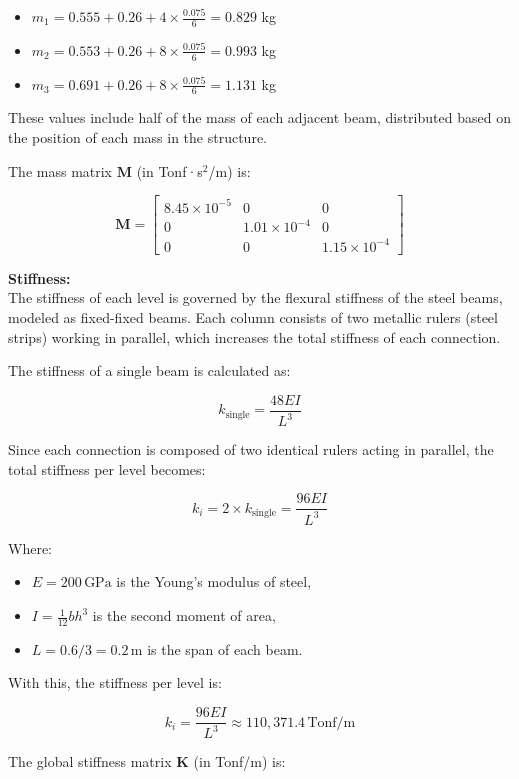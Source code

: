 \documentclass{article}  %
\begin{document}
\begin{itemize}
    \item $m_1 = 0.555 + 0.26 + 4 \times \frac{0.075}{6} = 0.829$ kg
    \item $m_2 = 0.553 + 0.26 + 8 \times \frac{0.075}{6} = 0.993$ kg
    \item $m_3 = 0.691 + 0.26 + 8 \times \frac{0.075}{6} = 1.131$ kg
\end{itemize}

These values include half of the mass of each adjacent beam, distributed based on the position of each mass in the structure.

The mass matrix $\mathbf{M}$ (in Tonf·s$^2$/m) is:

\[
\mathbf{M} = \begin{bmatrix}
8.45 \times 10^{-5} & 0 & 0 \\
0 & 1.01 \times 10^{-4} & 0 \\
0 & 0 & 1.15 \times 10^{-4}
\end{bmatrix}
\]

\textbf{Stiffness:} \\
The stiffness of each level is governed by the flexural stiffness of the steel beams, modeled as fixed-fixed beams. Each column consists of two metallic rulers (steel strips) working in parallel, which increases the total stiffness of each connection.

The stiffness of a single beam is calculated as:

\[
k_{\text{single}} = \frac{48EI}{L^3}
\]

Since each connection is composed of two identical rulers acting in parallel, the total stiffness per level becomes:

\[
k_i = 2 \times k_{\text{single}} = \frac{96EI}{L^3}
\]

Where:
\begin{itemize}
    \item $E = 200\,\text{GPa}$ is the Young's modulus of steel,
    \item $I = \frac{1}{12} b h^3$ is the second moment of area,
    \item $L = 0.6/3 = 0.2\,\text{m}$ is the span of each beam.
\end{itemize}

With this, the stiffness per level is:

\[
k_i = \frac{96EI}{L^3} \approx 110{,}371.4\, \text{Tonf/m}
\]

The global stiffness matrix $\mathbf{K}$ (in Tonf/m) is:
\end{document}
